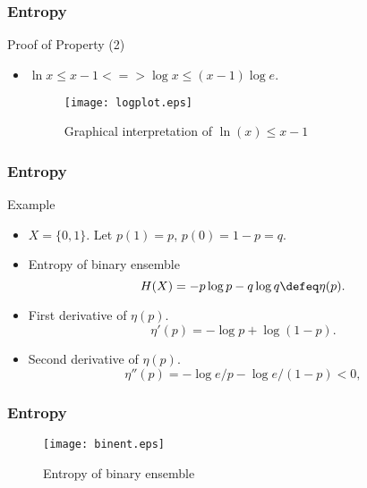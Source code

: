 \documentclass[14pt]{beamer}
\begin{document}
\begin{frame}
\frametitle{Entropy}
Proof of Property (2)
\begin{itemize}

    
    \item $\ln x \le x - 1  <=> \log x \le (x - 1)\log e.$ 
    
    \begin{center}
    \begin{figure}[ht]
    \begin{minipage}{0.8\linewidth}
    \begin{center}
    \texttt{[image: logplot.eps]}
    \caption{Graphical interpretation of $\ln (x) \leq x-1$}
    \label{logplot}
    \end{center}
    \end{minipage}
    \end{figure}
    \end{center}


\end{itemize}
\end{frame}



\begin{frame}
\frametitle{Entropy}
Example
\begin{itemize}
    
    \item $X = \{0,1\}$. Let $p(1) = p$, $p(0) = 1 - p = q$.
    
    \item Entropy of binary ensemble
    \begin{equation}
    \label{bin_entrop}
    H(X) = - p\log p - q\log q \defeq \eta (p).
    \end{equation}
    
    \item First derivative of $\eta(p)$. 
    \[
    \eta'(p) = - \log p + \log (1 - p).
    \]
    
    \item Second derivative of $\eta(p)$.
    \[
    \eta''(p) = - \log e / p - \log e / (1 - p) < 0,
    \]    
    
\end{itemize}
\end{frame}



\begin{frame}
\frametitle{Entropy}

    \begin{figure}[ht]
    \begin{minipage}{1.0\linewidth}
    \texttt{[image: binent.eps]}
    \caption{Entropy of binary ensemble} \label{binent}
    \end{minipage}
    \end{figure}

\end{frame}
\end{document}
